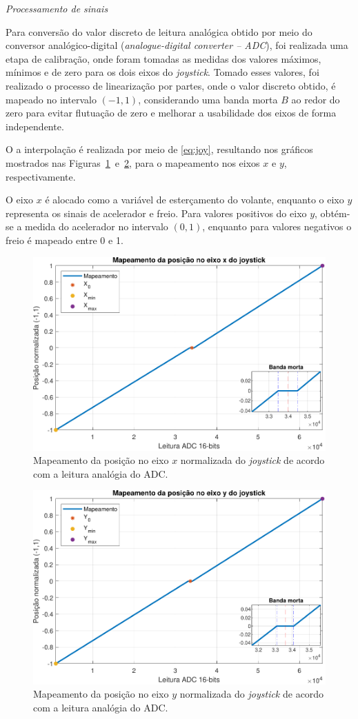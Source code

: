 \noindent \textit{Processamento de sinais}

Para conversão do valor discreto de leitura analógica obtido por meio do conversor analógico-digital (\textit{analogue-digital converter -- ADC}), foi realizada uma etapa de calibração, onde foram tomadas as medidas dos valores máximos, mínimos e de zero para os dois eixos do \textit{joystick}. Tomado esses valores, foi realizado o processo de linearização por partes, onde o valor discreto obtido, é mapeado no intervalo $(-1, 1)$, considerando uma banda morta $B$ ao redor do zero para evitar flutuação de zero e melhorar a usabilidade dos eixos de forma independente.

O a interpolação é realizada por meio de \eqref{eq:joy}, resultando nos gráficos mostrados nas Figuras~\ref{fig:plotjoyxaxis}~e~\ref{fig:plotjoyyaxis}, para o mapeamento nos eixos $x$ e $y$, respectivamente.

O eixo $x$ é alocado como a variável de esterçamento do volante, enquanto o eixo $y$ representa os sinais de acelerador e freio. Para valores positivos do eixo $y$, obtém-se a medida do acelerador no intervalo $(0,1)$, enquanto para valores negativos o freio é mapeado entre 0 e 1.

\begin{figure}
	\centering
	\includegraphics[width=0.75\linewidth]{img/plot_joy_x_axis.pdf}
	\caption{Mapeamento da posição no eixo $x$ normalizada do \textit{joystick} de acordo com a leitura analógia do ADC.}
	\label{fig:plotjoyxaxis}
\end{figure}

\begin{figure}
\centering
\includegraphics[width=0.75\linewidth]{img/plot_joy_y_axis.pdf}
\caption{Mapeamento da posição no eixo $y$ normalizada do \textit{joystick} de acordo com a leitura analógia do ADC.}
\label{fig:plotjoyyaxis}
\end{figure}


